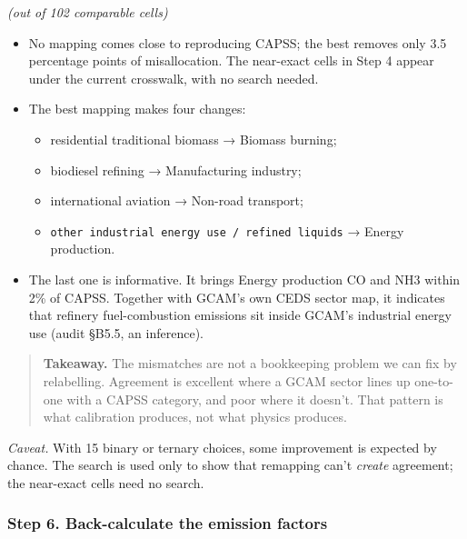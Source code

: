\emph{(out
of 102
comparable
cells)}

\begin{itemize}
\tightlist
\item
  No
  mapping
  comes
  close to
  reproducing
  CAPSS;
  the best
  removes
  only 3.5
  percentage
  points
  of
  misallocation.
  The
  near-exact
  cells in
  Step 4
  appear
  under
  the
  current
  crosswalk,
  with no
  search
  needed.
\item
  The best
  mapping
  makes
  four
  changes:

  \begin{itemize}
  \tightlist
  \item
    residential
    traditional
    biomass
    →
    Biomass
    burning;
  \item
    biodiesel
    refining
    →
    Manufacturing
    industry;
  \item
    international
    aviation
    →
    Non-road
    transport;
  \item
    \texttt{other\ industrial\ energy\ use\ /\allowbreak{}\ refined\ liquids}
    →
    Energy
    production.
  \end{itemize}
\item
  The last
  one is
  informative.
  It
  brings
  Energy
  production
  CO and
  NH3
  within
  2\% of
  CAPSS.
  Together
  with
  GCAM's
  own CEDS
  sector
  map, it
  indicates
  that
  refinery
  fuel-combustion
  emissions
  sit
  inside
  GCAM's
  industrial
  energy
  use
  (audit
  §B5.5,
  an
  inference).
\end{itemize}

\begin{quote}
\plainmark{}
\textbf{Takeaway.}
The
mismatches
are not a
bookkeeping
problem we
can fix by
relabelling.
Agreement
is
excellent
where a
GCAM
sector
lines up
one-to-one
with a
CAPSS
category,
and poor
where it
doesn't.
That
pattern is
what
calibration
produces,
not what
physics
produces.
\end{quote}

\emph{Caveat.}
With 15
binary or
ternary
choices,
some
improvement
is
expected
by chance.
The search
is used
only to
show that
remapping
can't
\emph{create}
agreement;
the
near-exact
cells need
no search.

\hypertarget{step-6.-back-calculate-the-emission-factors}{%
\subsubsection*{Step 6. Back-calculate the emission factors}\label{step-6.-back-calculate-the-emission-factors}}

